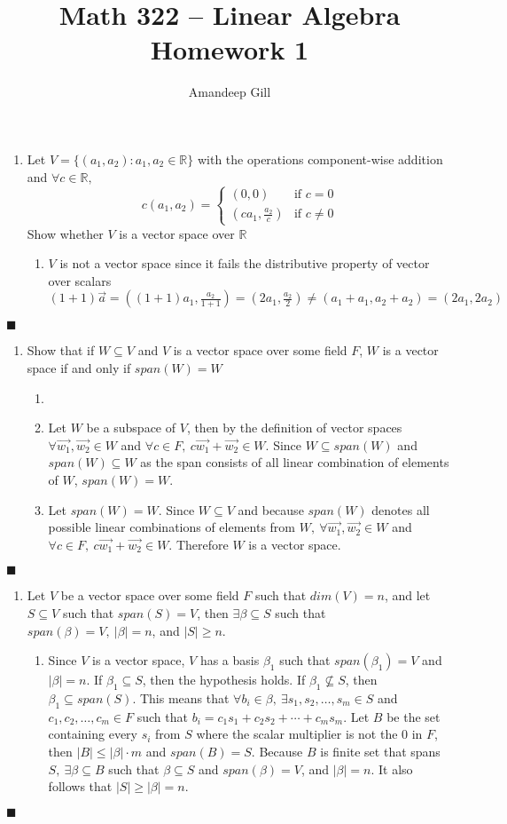 \documentclass[a4paper, 12pt]{report}
\newcommand{\bb}[1]{\mathbb{#1}}
\newcommand{\proof}[3]{
	\begin{enumerate}
		\item[\bf{Problem #1}] #2
		\begin{enumerate}
			\item[\bf{Proof:}]
			#3
		\end{enumerate}
	\end{enumerate}
	\begin{flushright}
		$\blacksquare$
	\end{flushright}
}
\begin{document}
\title{Math 322 -- Linear Algebra \\ \vspace{7px} \large{Homework 1}}
\author{Amandeep Gill}
\maketitle

\proof{1}{
	Let $V = \{(a_1,a_2) : a_1,a_2 \in \bb{R}\}$ with the operations component-wise addition and 
	$ \forall c \in \bb{R} ,$
	\[ c (a_1,a_2) = 
		\left\{
		\begin{array}{ll}
			(0,0) & \text{if } c = 0 \\
			(c a_1, \frac{a_2}{c}) & \text{if } c \ne 0
		\end{array}
		\right.
	\]
	Show whether $V$ is a vector space over $\bb{R}$
}{
	$V$ is not a vector space since it fails the distributive property of vector over scalars \\
	$(1 + 1)\vec{a} = ((1 + 1)a_1, \frac{a_2}{1 + 1}) = (2a_1,\frac{a_2}{2}) \ne (a_1 + a_1,a_2 + a_2) = (2a_1,2a_2)$
}

\proof{2}{
	Show that if $W \subseteq V$ and $V$ is a vector space over some field $F$, $W$ is a vector space if and only if $span(W) = W$
}{
	\item[$(\Rightarrow)$] 
		Let $W$ be a subspace of $V$, then by the definition of vector spaces $\forall \vec{w_1}, \vec{w_2} \in W$ and $\forall c \in F,\ c \vec{w_1} + \vec{w_2} \in W$. Since $W \subseteq span(W)$ and $span(W) \subseteq W$ as the span consists of all linear combination of elements of $W$, $span(W) = W$. \\
	\item[$(\Leftarrow)$]
		Let $span(W) = W$. Since $W \subseteq V$ and because $span(W)$ denotes all possible linear combinations of elements from $W,\ \forall \vec{w_1}, \vec{w_2} \in W$ and $\forall c \in F,\ c \vec{w_1} + \vec{w_2} \in W$. Therefore $W$ is a vector space.
}

\proof{3}{
	Let $V$ be a vector space over some field $F$ such that $dim(V) = n$, and let $S \subseteq V$ such that $span(S) = V$, then $\exists \beta \subseteq S$ such that $span(\beta) = V,\ |\beta| = n$, and $|S| \geqslant n$.
}{
	Since $V$ is a vector space, $V$ has a basis $\beta_1$ such that $span(\beta_1) = V$ and $|\beta| = n$. If $\beta_1 \subseteq S$, then the hypothesis holds. If $\beta_1 \not\subseteq S$, then $\beta_1 \subseteq span(S)$. This means that $\forall b_i \in \beta,\ \exists s_1,s_2,\ldots,s_m \in S$ and $c_1,c_2,\ldots,c_m \in F$ such that $b_i = c_1 s_1 + c_2 s_2 + \cdots + c_m s_m$. Let $B$ be the set containing every $s_i$ from $S$ where the scalar multiplier is not the 0 in $F$, then $|B| \leqslant |\beta| \cdot m$ and $span(B) = S$. Because $B$ is finite set that spans $S,\ \exists \beta \subseteq B$ such that $\beta \subseteq S$ and $span(\beta) = V$, and $|\beta| = n$. It also follows that $|S| \geqslant |\beta| = n$.
}
\end{document}
